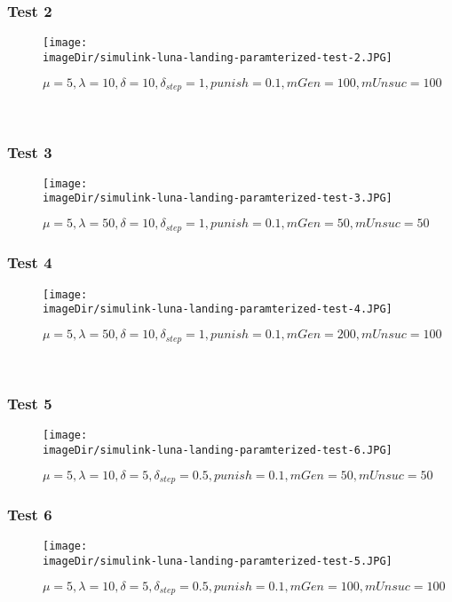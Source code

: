 \subsubsection{Test 2}
\begin{figure}[h]
	\centering
	\texttt{[image: \\imageDir/simulink-luna-landing-paramterized-test-2.JPG]}
	\caption{$\mu=5, \lambda=10, \delta=10, \delta_{step}=1, punish=0.1, mGen=100, mUnsuc=100 $}
	\label{fig:simulink-luna-landing-paramterized-test-2}
\end{figure}
\ \newpage

\subsubsection{Test 3}
\begin{figure}[h]
	\centering
	\texttt{[image: \\imageDir/simulink-luna-landing-paramterized-test-3.JPG]}
	\caption{$\mu=5, \lambda=50, \delta=10, \delta_{step}=1, punish=0.1, mGen=50, mUnsuc=50 $}
	\label{fig:simulink-luna-landing-paramterized-test-3}
\end{figure}

\subsubsection{Test 4}
\begin{figure}[h]
	\centering
	\texttt{[image: \\imageDir/simulink-luna-landing-paramterized-test-4.JPG]}
	\caption{$\mu=5, \lambda=50, \delta=10, \delta_{step}=1, punish=0.1, mGen=200, mUnsuc=100 $}
	\label{fig:simulink-luna-landing-paramterized-test-4}
\end{figure}
\ \newpage

\subsubsection{Test 5}
\begin{figure}[h]
	\centering
	\texttt{[image: \\imageDir/simulink-luna-landing-paramterized-test-6.JPG]}
	\caption{$\mu=5, \lambda=10, \delta=5, \delta_{step}=0.5, punish=0.1, mGen=50, mUnsuc=50 $}
	\label{fig:simulink-luna-landing-paramterized-test-5}
\end{figure}

\subsubsection{Test 6}
\begin{figure}[h]
	\centering
	\texttt{[image: \\imageDir/simulink-luna-landing-paramterized-test-5.JPG]}
	\caption{$\mu=5, \lambda=10, \delta=5, \delta_{step}=0.5, punish=0.1, mGen=100, mUnsuc=100 $}
	\label{fig:simulink-luna-landing-paramterized-test-6}
\end{figure}
\ \newpage

